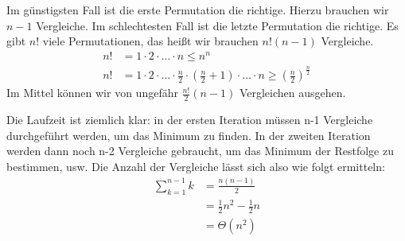 \begin{Lza}[Bogosort]
\hspace{\parindent}Im günstigsten Fall ist die erste Permutation die richtige. Hierzu brauchen wir $n-1$ Vergleiche. Im schlechtesten Fall ist die letzte Permutation die richtige. Es gibt $n!$ viele Permutationen, das heißt wir brauchen $n!(n-1)$ Vergleiche.
\begin{align*}
  n! & = 1 \cdot 2 \cdot \ldots \cdot n \le n^n \\
  n! & = 1 \cdot 2 \cdot \ldots \cdot \frac{n}{2} \cdot (\frac{n}{2} + 1) \cdot \ldots \cdot n \ge (\frac{n}{2})^\frac{n}{2}
\end{align*}
Im Mittel können wir von ungefähr $\frac{n!}{2}(n-1)$ Vergleichen ausgehen.
\end{Lza}

\begin{Lza}
\hspace{\parindent}Die Laufzeit ist ziemlich klar: in der ersten Iteration müssen n-1 Vergleiche durchgeführt werden, um das Minimum zu finden. In der zweiten Iteration werden dann noch n-2 Vergleiche gebraucht, um das Minimum der Restfolge zu bestimmen, usw. Die Anzahl der Vergleiche lässt sich also wie folgt ermitteln:
\begin{align*}
  \sum_{k=1}^{n-1 }k &= \frac{n(n-1)}{2}\\
                     &= \frac{1}{2}n^2 - \frac{1}{2} n\\
                     &= \Theta(n^2)
\end{align*}
\end{Lza}

